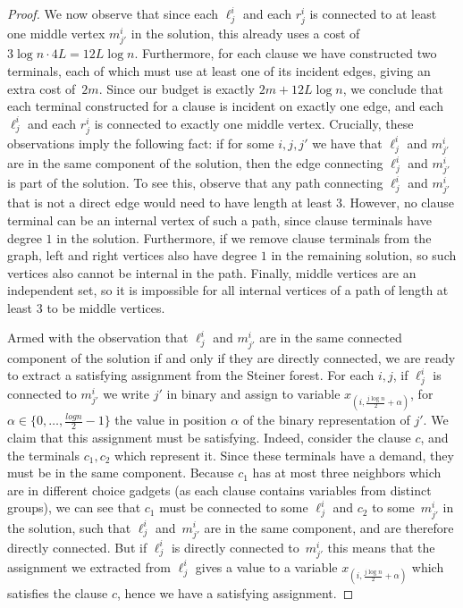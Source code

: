 \documentclass[a4paper]{article}
\theoremstyle{plain}
\begin{document}
\begin{proof}
We now observe that since each $\ell^i_j$ and each $r^i_j$ is connected to at
least one middle vertex $m^i_{j'}$ in the solution, this already uses a cost of
$3\log n\cdot 4L = 12 L\log n$. Furthermore, for each clause we have
constructed two terminals, each of which must use at least one of its incident
edges, giving an extra cost of~$2m$. Since our budget is exactly $2m+12L\log
n$, we conclude that each terminal constructed for a clause is incident on
exactly one edge, and each $\ell^i_j$ and each $r^i_j$ is connected to exactly
one middle vertex. Crucially, these observations imply the following fact: if
for some $i,j,j'$ we have that $\ell^i_j$ and $m^i_{j'}$ are in the same
component of the solution, then the edge connecting $\ell^i_j$ and $m^i_{j'}$
is part of the solution. To see this, observe that any path connecting
$\ell^i_j$ and $m^i_{j'}$ that is not a direct edge would need to have length at
least $3$. However, no clause terminal can be an internal vertex of such a
path, since clause terminals have degree $1$ in the solution. Furthermore, if
we remove clause terminals from the graph, left and right vertices also have
degree $1$ in the remaining solution, so such vertices also cannot be internal
in the path. Finally, middle vertices are an independent set, so it is
impossible for all internal vertices of a path of length at least $3$ to be
middle vertices.

Armed with the observation that $\ell^i_j$ and $m^i_{j'}$ are in the same
connected component of the solution if and only if they are directly connected,
we are ready to extract a satisfying assignment from the Steiner forest. For
each $i,j$, if $\ell^i_j$ is connected to $m^i_{j'}$ we write $j'$ in binary
and assign to variable $x_{(i,\frac{j\log n}{2}+\alpha)}$, for
$\alpha\in\{0,\ldots,\frac{log n}{2}-1\}$ the value in  position $\alpha$ of
the binary representation of $j'$. We claim that this assignment must be
satisfying. Indeed, consider the clause $c$, and the terminals $c_1,c_2$ which
represent it. Since these terminals have a demand, they must be in the same
component. Because $c_1$ has at most three neighbors which are in different
choice gadgets (as each clause contains variables from distinct groups), we can
see that $c_1$ must be connected to some $\ell^i_j$ and $c_2$ to some~$m^i_{j'}$
in the solution, such that $\ell^i_j$ and~$m^i_{j'}$ are in the same
component, and are therefore directly connected.  But if $\ell^i_j$ is directly
connected to~$m^i_{j'}$ this means that the assignment we extracted from
$\ell^i_j$ gives a value to a variable $x_{(i,\frac{j\log n}{2}+\alpha)}$ which
satisfies the clause $c$, hence we have a satisfying assignment.  \end{proof}
\end{document}
